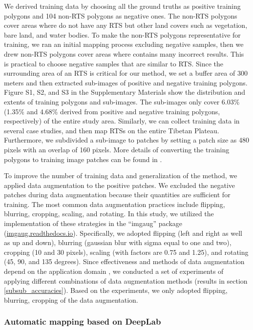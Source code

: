 \documentclass[preprint,12pt,authoryear]{elsarticle}
\begin{document}
We derived training data by choosing all the ground truths as positive training polygons and 104 non-RTS polygons as negative ones. The non-RTS polygons cover areas where do not have any RTS but other land covers such as vegetation, bare land, and water bodies. To make the non-RTS polygons representative for training, we ran an initial mapping process excluding negative samples, then we drew non-RTS polygons cover areas where contains many incorrect results. This is practical to choose negative samples that are similar to RTS. Since the surrounding area of an RTS is critical for our method, we set a buffer area of 300 meters and then extracted sub-images of positive and negative training polygons. Figure S1, S2, and S3 in the Supplementary Materials show the distribution and extents of training polygons and sub-images. The sub-images only cover 6.03\% (1.35\% and 4.68\% derived from positive and negative training polygons, respectively) of the entire study area. Similarly, we can collect training data in several case studies, and then map RTSs on the entire Tibetan Plateau. Furthermore, we subdivided a sub-image to patches by setting a patch size as 480 pixels with an overlap of 160 pixels. More details of converting the training polygons to training image patches can be found in \cite{huang2018automatic}. 

To improve the number of training data and generalization of the method, we applied data augmentation to the positive patches. We excluded the negative patches during data augmentation because their quantities are sufficient for training. The most common data augmentation practices include flipping, blurring, cropping, scaling, and rotating. In this study, we utilized the implementation of these strategies in the “imgaug” package (\url{imgaug.readthedocs.io}). Specifically, we adopted flipping (left and right as well as up and down), blurring (gaussian blur with sigma equal to one and two), cropping (10 and 30 pixels), scaling (with factors are 0.75 and 1.25), and rotating (45, 90, and 135 degrees). Since effectiveness and methods of data augmentation depend on the application domain \citep{perez2017effectiveness}, we conducted a set of experiments of applying different combinations of data augmentation methods (results in section \ref{subsub_accuracies}). Based on the experiments, we only adopted flipping, blurring, cropping of the data augmentation. 

\subsubsection{Automatic mapping based on DeepLab}
\label{subsubsec_deeplab}
\end{document}

